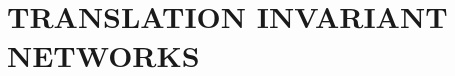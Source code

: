 \documentclass[letterpaper, 10pt, conference]{ieeeconf}  %
\begin{document}
%
%
%
%
%
%
%
%
%
%
%
%

\section{TRANSLATION INVARIANT NETWORKS%
}\label{sec:sys}
\end{document}
